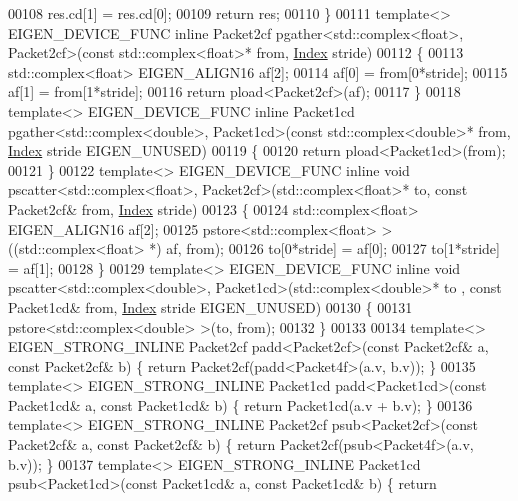 \begin{DoxyCode}
00108   res.cd[1] = res.cd[0];
00109   \textcolor{keywordflow}{return} res;
00110 \}
00111 \textcolor{keyword}{template}<> EIGEN\_DEVICE\_FUNC \textcolor{keyword}{inline} Packet2cf pgather<std::complex<float>, Packet2cf>(\textcolor{keyword}{const} 
      std::complex<float>* from, \hyperlink{namespace_eigen_a62e77e0933482dafde8fe197d9a2cfde}{Index} stride)
00112 \{
00113   std::complex<float> EIGEN\_ALIGN16 af[2];
00114   af[0] = from[0*stride];
00115   af[1] = from[1*stride];
00116   \textcolor{keywordflow}{return} pload<Packet2cf>(af);
00117 \}
00118 \textcolor{keyword}{template}<> EIGEN\_DEVICE\_FUNC \textcolor{keyword}{inline} Packet1cd pgather<std::complex<double>, Packet1cd>(\textcolor{keyword}{const} 
      std::complex<double>* from, \hyperlink{namespace_eigen_a62e77e0933482dafde8fe197d9a2cfde}{Index} stride EIGEN\_UNUSED)
00119 \{
00120   \textcolor{keywordflow}{return} pload<Packet1cd>(from);
00121 \}
00122 \textcolor{keyword}{template}<> EIGEN\_DEVICE\_FUNC \textcolor{keyword}{inline} \textcolor{keywordtype}{void} pscatter<std::complex<float>, Packet2cf>(std::complex<float>* to, \textcolor{keyword}{
      const} Packet2cf& from, \hyperlink{namespace_eigen_a62e77e0933482dafde8fe197d9a2cfde}{Index} stride)
00123 \{
00124   std::complex<float> EIGEN\_ALIGN16 af[2];
00125   pstore<std::complex<float> >((std::complex<float> *) af, from);
00126   to[0*stride] = af[0];
00127   to[1*stride] = af[1];
00128 \}
00129 \textcolor{keyword}{template}<> EIGEN\_DEVICE\_FUNC \textcolor{keyword}{inline} \textcolor{keywordtype}{void} pscatter<std::complex<double>, Packet1cd>(std::complex<double>* to
      , \textcolor{keyword}{const} Packet1cd& from, \hyperlink{namespace_eigen_a62e77e0933482dafde8fe197d9a2cfde}{Index} stride EIGEN\_UNUSED)
00130 \{
00131   pstore<std::complex<double> >(to, from);
00132 \}
00133 
00134 \textcolor{keyword}{template}<> EIGEN\_STRONG\_INLINE Packet2cf padd<Packet2cf>(\textcolor{keyword}{const} Packet2cf& a, \textcolor{keyword}{const} Packet2cf& b) \{ \textcolor{keywordflow}{return} 
      Packet2cf(padd<Packet4f>(a.v, b.v)); \}
00135 \textcolor{keyword}{template}<> EIGEN\_STRONG\_INLINE Packet1cd padd<Packet1cd>(\textcolor{keyword}{const} Packet1cd& a, \textcolor{keyword}{const} Packet1cd& b) \{ \textcolor{keywordflow}{return} 
      Packet1cd(a.v + b.v); \}
00136 \textcolor{keyword}{template}<> EIGEN\_STRONG\_INLINE Packet2cf psub<Packet2cf>(\textcolor{keyword}{const} Packet2cf& a, \textcolor{keyword}{const} Packet2cf& b) \{ \textcolor{keywordflow}{return} 
      Packet2cf(psub<Packet4f>(a.v, b.v)); \}
00137 \textcolor{keyword}{template}<> EIGEN\_STRONG\_INLINE Packet1cd psub<Packet1cd>(\textcolor{keyword}{const} Packet1cd& a, \textcolor{keyword}{const} Packet1cd& b) \{ \textcolor{keywordflow}{return} 

\end{DoxyCode}
